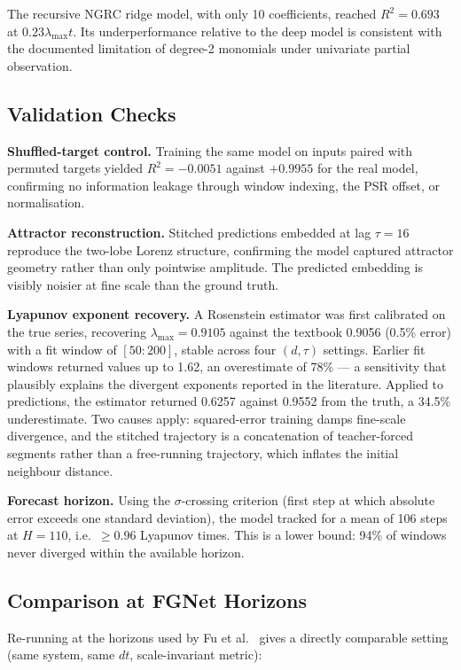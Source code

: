 \documentclass[11pt,a4paper]{article}
\begin{document}
The recursive NGRC ridge model, with only 10 coefficients, reached $R^2 = 0.693$ at $0.23\lambda_{\max}t$.
Its underperformance relative to the deep model is consistent with the documented limitation of degree-2 monomials under univariate partial observation.


\subsection{Validation Checks}

\textbf{Shuffled-target control.}
Training the same model on inputs paired with permuted targets yielded $R^2 = -0.0051$ against $+0.9955$ for the real model, confirming no information leakage through window indexing, the PSR offset, or normalisation.

\textbf{Attractor reconstruction.}
Stitched predictions embedded at lag $\tau = 16$ reproduce the two-lobe Lorenz structure, confirming the model captured attractor geometry rather than only pointwise amplitude.
The predicted embedding is visibly noisier at fine scale than the ground truth.

\textbf{Lyapunov exponent recovery.}
A Rosenstein estimator was first calibrated on the true series, recovering $\lambda_{\max} = 0.9105$ against the textbook 0.9056 (0.5\% error) with a fit window of $[50{:}200]$, stable across four $(d, \tau)$ settings.
Earlier fit windows returned values up to 1.62, an overestimate of 78\% --- a sensitivity that plausibly explains the divergent exponents reported in the literature.
Applied to predictions, the estimator returned 0.6257 against 0.9552 from the truth, a 34.5\% underestimate.
Two causes apply: squared-error training damps fine-scale divergence, and the stitched trajectory is a concatenation of teacher-forced segments rather than a free-running trajectory, which inflates the initial neighbour distance.

\textbf{Forecast horizon.}
Using the $\sigma$-crossing criterion (first step at which absolute error exceeds one standard deviation), the model tracked for a mean of 106 steps at $H = 110$, i.e.\ $\geq 0.96$ Lyapunov times.
This is a lower bound: 94\% of windows never diverged within the available horizon.


\subsection{Comparison at FGNet Horizons}

Re-running at the horizons used by Fu et al.~\cite{fu2024} gives a directly comparable setting (same system, same $dt$, scale-invariant metric):
\end{document}
